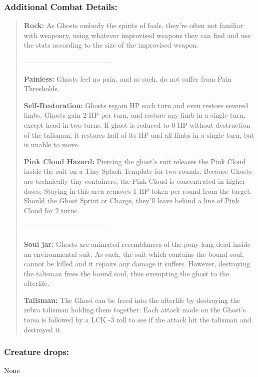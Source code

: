 \documentclass[11pt,a4paper,twocolumn]{book}
\begin{document}
	\subsubsection*{Additional Combat Details:}
	\begin{verse}
		
		\textbf{Rock:} As Ghosts embody the spirits of foals, they're often not familiar with weaponry, using whatever improvised weapons they can find and use the stats according to the size of the improvised weapon.
		
		--------------------------------------
		
		\textbf{Painless:} Ghosts feel no pain, and as such, do not suffer from Pain Thresholds.
		
		\textbf{Self-Restoration:} Ghosts regain HP each turn and even restore severed limbs. Ghosts gain 2 HP per turn, and restore any limb in a single turn, except head in two turns. If ghost is reduced to 0 HP without destruction of the talisman, it restores half of its HP and all limbs in a single turn, but is unable to move. 
		
		\textbf{Pink Cloud Hazard:} Piercing the ghost's suit releases the Pink Cloud inside the suit on a Tiny Splash Template for two rounds. Because Ghosts are technically tiny containers, the Pink Cloud is concentrated in higher doses; Staying in this area removes 1 HP token per round from the target. Should the Ghost Sprint or Charge, they'll leave behind a line of Pink Cloud for 2 turns.
		
		--------------------------------------
		
		\textbf{Soul jar:} Ghosts are animated resemblances of the pony long dead inside an environmental suit. As such, the suit which contains the bound soul, cannot be killed and it repairs any damage it suffers. However, destroying the talisman frees the bound soul, thus exempting the ghost to the afterlife.		
		
		\textbf{Talisman:} The Ghost can be freed into the afterlife by destroying the zebra talisman holding them together. Each attack made on the Ghost's torso is followed by a LCK -3 roll to see if the attack hit the talisman and destroyed it.
		
	\end{verse}
	
	\subsubsection*{Creature drops:}
	None
	
\end{document}
